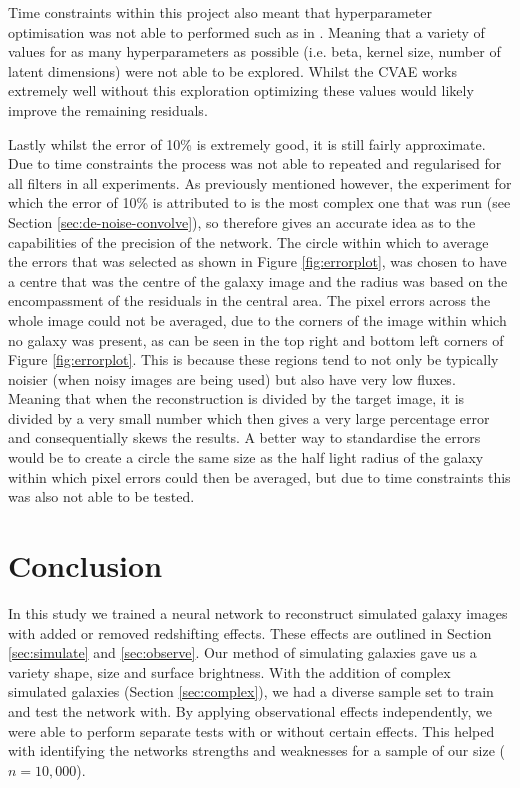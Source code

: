 \documentclass[fleqn,usenatbib]{mnras}
\begin{document}
Time constraints within this project also meant that hyperparameter optimisation was not able to performed such as in \citet{Bergestra2011, Hutter2011}. Meaning that a variety of values for as many hyperparameters as possible (i.e. beta, kernel size, number of latent dimensions) were not able to be explored. Whilst the CVAE works extremely well without this exploration optimizing these values would likely improve the remaining residuals. 

Lastly whilst the error of 10\% is extremely good, it is still fairly approximate. Due to time constraints the process was not able to repeated and regularised for all filters in all experiments. As previously mentioned however, the experiment for which the error of 10\% is attributed to is the most complex one that was run (see Section \ref{sec:de-noise-convolve}), so therefore gives an accurate idea as to the capabilities of the precision of the network. The circle within which to average the errors that was selected as shown in Figure \ref{fig:errorplot}, was chosen to have a centre that was the centre of the galaxy image and the radius was based on the encompassment of the residuals in the central area. The pixel errors across the whole image could not be averaged, due to the corners of the image within which no galaxy was present, as can be seen in the top right and bottom left corners of Figure \ref{fig:errorplot}. This is because these regions tend to not only be typically noisier (when noisy images are being used) but also have very low fluxes. Meaning that when the reconstruction is divided by the target image, it is divided by a very small number which then gives a very large percentage error and consequentially skews the results. A better way to standardise the errors would be to create a circle the same size as the half light radius of the galaxy within which pixel errors could then be averaged, but due to time constraints this was also not able to be tested.

\section{Conclusion}
In this study we trained a neural network to reconstruct simulated galaxy images with added or removed redshifting effects. These effects are outlined in Section \ref{sec:simulate} and \ref{sec:observe}. Our method of simulating galaxies gave us a variety shape, size and surface brightness. With the addition of complex simulated galaxies (Section \ref{sec:complex}), we had a diverse sample set to train and test the network with. By applying observational effects independently, we were able to perform separate tests with or without certain effects. This helped with identifying the networks strengths and weaknesses for a sample of our size ($n=10,000$).
\end{document}
